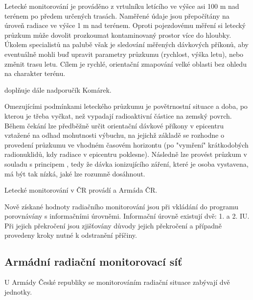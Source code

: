 \begin{itemize}
	Letecké monitorování je prováděno z vrtulníku letícího ve výšce asi 100 m nad terénem po předem určených trasách. Naměřené údaje jsou přepočítány na úroveň radiace ve výšce 1 m nad terénem. Oproti pojezdovému měření si letecký průzkum může dovolit prozkoumat kontaminovaný prostor více do hloubky. Úkolem specialistů na palubě však je sledování měřených dávkových příkonů, aby eventuálně mohli buď upravit parametry průzkumu (rychlost, výška letu), nebo změnit trasu letu. Cílem je rychlé, orientační zmapování velké oblasti bez ohledu na charakter terénu. 
	
	 doplňuje dále nadporučík Komárek. 
	
	Omezujícími podmínkami leteckého průzkumu je povětrnostní situace a doba, po kterou je třeba vyčkat, než vypadají radioaktivní částice na zemský povrch. Během čekání lze předběžně určit orientační dávkové příkony v epicentru vztažené na odhad mohutnosti výbuchu, na jejichž základě se rozhodne o provedení průzkumu ve vhodném časovém horizontu (po "vymření" krátkodobých radionuklidů, kdy radiace v epicentru poklesne). Následně lze provést průzkum v souladu s principem , tedy že dávka ionizujícího záření, které je osoba vystavena, má být tak nízká, jaké lze rozumně dosáhnout.
	
	Letecké monitorování v ČR provádí  a Armáda ČR. 

\end{itemize}
	
	Nově získané hodnoty radiačního monitorování jsou při vkládání do programu  porovnávány s informačními úrovněmi. Informační úrovně existují dvě: 1. a 2. IU. Při jejich překročení jsou zjišťovány důvody jejich překročení a případně provedeny kroky nutné k odstranění příčiny.
	
\subsection{Armádní radiační monitorovací síť}	
	
	
	U Armády České republiky se monitorováním radiační situace zabývají dvě jednotky. 
	 
